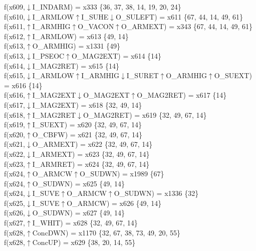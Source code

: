 f(x609,$\downarrow$I\_INDARM) = x333 \{36, 37, 38, 14, 19, 20, 24\} \\  
f(x610,$\downarrow$I\_ARMLOW$\uparrow$I\_SUHE$\downarrow$O\_SULEFT) = x611 \{67, 44, 14, 49, 61\} \\  
f(x611,$\uparrow$I\_ARMHIG$\uparrow$O\_VACON$\uparrow$O\_ARMEXT) = x343 \{67, 44, 14, 49, 61\} \\  
f(x612,$\uparrow$I\_ARMLOW) = x613 \{49, 14\} \\  
f(x613,$\uparrow$O\_ARMHIG) = x1331 \{49\} \\  
f(x613,$\downarrow$I\_PSEOC$\uparrow$O\_MAG2EXT) = x614 \{14\} \\  
f(x614,$\downarrow$I\_MAG2RET) = x615 \{14\} \\  
f(x615,$\downarrow$I\_ARMLOW$\uparrow$I\_ARMHIG$\downarrow$I\_SURET$\uparrow$O\_ARMHIG$\uparrow$O\_SUEXT) = x616 \{14\} \\  
f(x616,$\uparrow$I\_MAG2EXT$\downarrow$O\_MAG2EXT$\uparrow$O\_MAG2RET) = x617 \{14\} \\  
f(x617,$\downarrow$I\_MAG2EXT) = x618 \{32, 49, 14\} \\  
f(x618,$\uparrow$I\_MAG2RET$\downarrow$O\_MAG2RET) = x619 \{32, 49, 67, 14\} \\  
f(x619,$\uparrow$I\_SUEXT) = x620 \{32, 49, 67, 14\} \\  
f(x620,$\uparrow$O\_CBFW) = x621 \{32, 49, 67, 14\} \\  
f(x621,$\downarrow$O\_ARMEXT) = x622 \{32, 49, 67, 14\} \\  
f(x622,$\downarrow$I\_ARMEXT) = x623 \{32, 49, 67, 14\} \\  
f(x623,$\uparrow$I\_ARMRET) = x624 \{32, 49, 67, 14\} \\  
f(x624,$\uparrow$O\_ARMCW$\uparrow$O\_SUDWN) = x1989 \{67\} \\  
f(x624,$\uparrow$O\_SUDWN) = x625 \{49, 14\} \\  
f(x624,$\downarrow$I\_SUVE$\uparrow$O\_ARMCW$\uparrow$O\_SUDWN) = x1336 \{32\} \\  
f(x625,$\downarrow$I\_SUVE$\uparrow$O\_ARMCW) = x626 \{49, 14\} \\  
f(x626,$\downarrow$O\_SUDWN) = x627 \{49, 14\} \\  
f(x627,$\uparrow$I\_WHIT) = x628 \{32, 49, 67, 14\} \\  
f(x628,$\uparrow$ConcDWN) = x1170 \{32, 67, 38, 73, 49, 20, 55\} \\  
f(x628,$\uparrow$ConcUP) = x629 \{38, 20, 14, 55\} \\  
